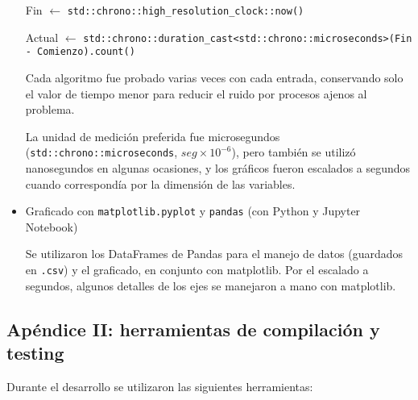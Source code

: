 \begin{itemize}
\begin{algorithm}[H]
{			Fin $\leftarrow$ \texttt{std::chrono::high\_resolution\_clock::now()}

			Actual $\leftarrow$ \texttt{std::chrono::duration\_cast<std::chrono::microseconds>(Fin - Comienzo).count()}

		}
		\end{algorithm}

		Cada algoritmo fue probado varias veces con cada entrada, conservando solo el valor de tiempo menor para reducir el ruido por procesos ajenos al problema.

		La unidad de medición preferida fue microsegundos (\texttt{std::chrono::microseconds}, $seg \times 10^{-6}$), pero también se utilizó nanosegundos en algunas ocasiones, y los gráficos fueron escalados a segundos cuando correspondía por la dimensión de las variables.

		\item Graficado con \texttt{matplotlib.pyplot} y \texttt{pandas} (con Python y Jupyter Notebook)

		Se utilizaron los DataFrames de Pandas para el manejo de datos (guardados en \texttt{.csv}) y el graficado, en conjunto con matplotlib. Por el escalado a segundos, algunos detalles de los ejes se manejaron a mano con matplotlib.

	\end{itemize}

	\subsection{Apéndice II: herramientas de compilación y testing}
	Durante el desarrollo se utilizaron las siguientes herramientas:

